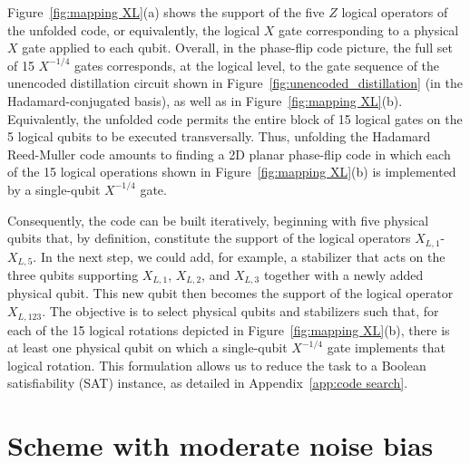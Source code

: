 \documentclass[%
 reprint,
superscriptaddress,
 amsmath,amssymb,
 aps,
]{revtex4-2}
\begin{document}
Figure~\ref{fig:mapping XL}(a) shows the support of the five $Z$ logical operators of the unfolded code, or equivalently, the logical $X$ gate corresponding to a physical $X$ gate applied to each qubit. Overall, in the phase-flip code picture, the full set of 15 $X^{-1/4}$ gates corresponds, at the logical level, to the gate sequence of the unencoded distillation circuit shown in Figure~\ref{fig:unencoded_distillation} (in the Hadamard-conjugated basis), as well as in Figure~\ref{fig:mapping XL}(b). Equivalently, the unfolded code permits the entire block of 15 logical gates on the 5 logical qubits to be executed transversally. Thus, unfolding the Hadamard Reed-Muller code amounts to finding a 2D planar phase-flip code in which each of the 15 logical operations shown in Figure~\ref{fig:mapping XL}(b) is implemented by a single-qubit $X^{-1/4}$ gate.

Consequently, the code can be built iteratively, beginning with five physical qubits that, by definition, constitute the support of the logical operators $X_{L,1}$-$X_{L,5}$. In the next step, we could add, for example, a stabilizer that acts on the three qubits supporting $X_{L,1}$, $X_{L,2}$, and $X_{L,3}$ together with a newly added physical qubit. This new qubit then becomes the support of the logical operator $X_{L,123}$. The objective is to select physical qubits and stabilizers such that, for each of the 15 logical rotations depicted in Figure~\ref{fig:mapping XL}(b), there is at least one physical qubit on which a single-qubit $X^{-1/4}$ gate implements that logical rotation. This formulation allows us to reduce the task to a Boolean satisfiability (SAT) instance, as detailed in Appendix~\ref{app:code search}.

\section{Scheme with moderate noise bias}
\label{sec:surface_code}
\end{document}
